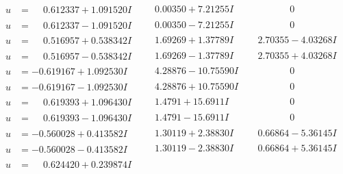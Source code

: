 \documentclass[1p]{elsarticle_modified}
\theoremstyle{definition}
\begin{document}
$$\begin{array}{c|c|c}
\begin{aligned}
u &= \phantom{-}0.612337 + 1.091520 I\end{aligned}
 & \phantom{-}0.00350 + 7.21255 I & \phantom{-0.000000 } 0 \\ \hline\begin{aligned}
u &= \phantom{-}0.612337 - 1.091520 I\end{aligned}
 & \phantom{-}0.00350 - 7.21255 I & \phantom{-0.000000 } 0 \\ \hline\begin{aligned}
u &= \phantom{-}0.516957 + 0.538342 I\end{aligned}
 & \phantom{-}1.69269 + 1.37789 I & \phantom{-}2.70355 - 4.03268 I \\ \hline\begin{aligned}
u &= \phantom{-}0.516957 - 0.538342 I\end{aligned}
 & \phantom{-}1.69269 - 1.37789 I & \phantom{-}2.70355 + 4.03268 I \\ \hline\begin{aligned}
u &= -0.619167 + 1.092530 I\end{aligned}
 & \phantom{-}4.28876 - 10.75590 I & \phantom{-0.000000 } 0 \\ \hline\begin{aligned}
u &= -0.619167 - 1.092530 I\end{aligned}
 & \phantom{-}4.28876 + 10.75590 I & \phantom{-0.000000 } 0 \\ \hline\begin{aligned}
u &= \phantom{-}0.619393 + 1.096430 I\end{aligned}
 & \phantom{-}1.4791 + 15.6911 I & \phantom{-0.000000 } 0 \\ \hline\begin{aligned}
u &= \phantom{-}0.619393 - 1.096430 I\end{aligned}
 & \phantom{-}1.4791 - 15.6911 I & \phantom{-0.000000 } 0 \\ \hline\begin{aligned}
u &= -0.560028 + 0.413582 I\end{aligned}
 & \phantom{-}1.30119 + 2.38830 I & \phantom{-}0.66864 - 5.36145 I \\ \hline\begin{aligned}
u &= -0.560028 - 0.413582 I\end{aligned}
 & \phantom{-}1.30119 - 2.38830 I & \phantom{-}0.66864 + 5.36145 I \\ \hline\begin{aligned}
u &= \phantom{-}0.624420 + 0.239874 I\end{aligned}

\end{array}$$
\end{document}
